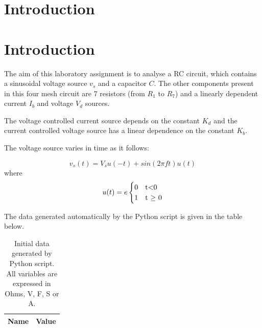 \section{Introduction}
\label{introduction}


\section{Introduction}
\label{introduction}

\par The aim of this laboratory assignment is to analyse a RC circuit, which contains a sinusoidal voltage source $v_s$ and a capacitor $C$. The other components present in this four mesh circuit are 7 resistors (from $R_1$ to $R_7$) and a linearly dependent current $I_b$ and voltage $V_d$ sources.
\par The voltage controlled current source depends on the constant $K_d$ and the current controlled voltage source has a linear dependence on the constant $K_b$.

\par The voltage source varies in time as it follows:

\begin{equation}
	v_s(t) = V_s u(-t) + sin(2 \pi f t)u(t)
	\label {equation:n1}
\end{equation}
where
\begin{equation}
	u(t)=e
	\begin{cases}
		0 & $t$ < $0$ \\
		1 & $t $\geq$ 0$
	\end{cases}
	\label {eq:n2}
\end{equation}

\par The data generated automatically by the Python script is given in the table below.

\begin{table}[ht]
  \centering
  \begin{tabular}{|l|r|}
    \hline    
    {\bf Name} & {\bf Value} \\ \hline
    
  \end{tabular}
  \caption{Initial data generated by Python script. All variables are expressed in Ohms, V, F, S or A.}
  \label{tab:initial_data}
\end{table}



